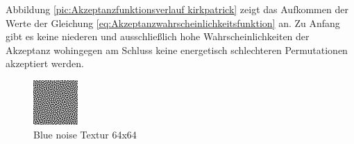 Abbildung \ref{pic:Akzeptanzfunktionsverlauf kirkpatrick} zeigt das Aufkommen der Werte der Gleichung
\ref{eq:Akzeptanzwahrscheinlichkeitsfunktion} an. Zu Anfang gibt es keine niederen und ausschließlich 
hohe Wahrscheinlichkeiten der Akzeptanz wohingegen am Schluss keine energetisch schlechteren Permutationen 
akzeptiert werden.

\begin{figure}[H]
    \centering
    \begin{minipage}[t]{0.45\linewidth}
        \centering
        \includegraphics[interpolate=false,width=\linewidth]{content/simulatedAnnealing/Bilder/LDR_RGBA_0_64-RGBA_r_channel.png}
        \caption{Blue noise Textur 64x64}
    \end{minipage}
    \hfill
    \begin{minipage}[t]{0.45\linewidth}
        \centering

\end{minipage}
\end{figure}
